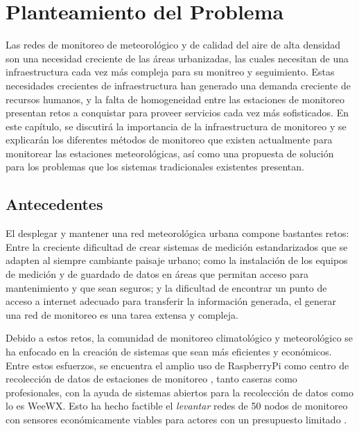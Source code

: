 \chapter{Planteamiento del Problema}


Las redes de monitoreo de meteorológico y de calidad del aire de alta densidad son una necesidad creciente de las áreas urbanizadas, las cuales necesitan de una infraestructura cada vez más compleja para su monitreo y seguimiento. Estas necesidades crecientes de infraestructura han generado una demanda creciente de recursos humanos, y la falta de homogeneidad entre las estaciones de monitoreo presentan retos a conquistar para proveer servicios cada vez más sofisticados. En este capítulo, se discutirá la importancia de la infraestructura de monitoreo y se explicarán los diferentes métodos de monitoreo que existen actualmente para monitorear las estaciones meteorológicas, así como una propuesta de solución para los problemas que los sistemas tradicionales existentes presentan.

\section{Antecedentes}

El desplegar y mantener una red meteorológica urbana compone bastantes retos: Entre la creciente dificultad de crear sistemas de medición estandarizados que se adapten al siempre cambiante paisaje urbano; como la instalación de los equipos de medición y de guardado de datos en áreas que permitan acceso para mantenimiento y que sean seguros; y la dificultad de encontrar un punto de acceso a internet adecuado para transferir la información generada, el generar una red de monitoreo es una tarea extensa y compleja.

Debido a estos retos, la comunidad de monitoreo climatológico y meteorológico se ha enfocado en la creación de sistemas que sean más eficientes y económicos. Entre estos esfuerzos, se encuentra el amplio uso de RaspberryPi como centro de recolección de datos de estaciones de monitoreo \cite{rpi_weataher_station}, tanto caseras como profesionales, con la ayuda de sistemas abiertos para la recolección de datos como lo es WeeWX. Esto ha hecho factible el \textit{levantar} redes de 50 nodos de monitoreo con sensores económicamente viables para actores con un presupuesto limitado \cite{monitoreo_raspberry_nagios}.

